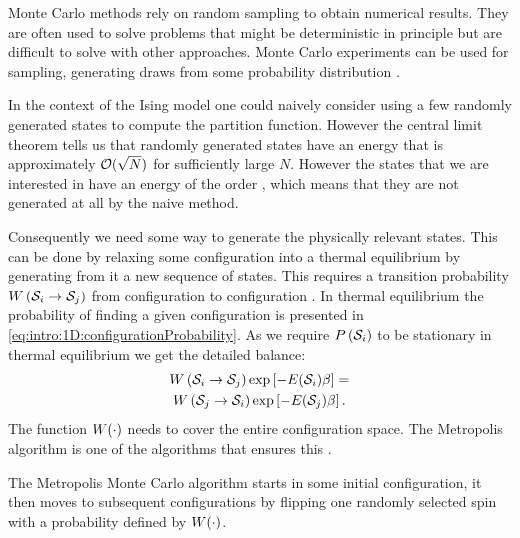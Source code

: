 
Monte Carlo methods rely on random sampling to obtain numerical results. They are often used to solve problems that might be deterministic in principle but are difficult to solve with other approaches. Monte Carlo experiments can be used for sampling, \ie generating draws from some probability distribution \cite{kroese2014monte}. 

In the context of the Ising model one could naively consider using a few randomly generated states to compute the partition function. However the central limit theorem tells us that randomly generated states have an energy that is approximately $\mathcal{O}(\sqrt{N})$ for sufficiently large $N$. However the states that we are interested in have an energy of the order , which means that they are not generated at all by the naive method. 

Consequently we need some way to generate the physically relevant states. This can be done by relaxing some configuration into a thermal equilibrium by generating from it a new sequence of states. This requires a transition probability $W\left(\mathcal{S}_{i} \to \mathcal{S}_{j} \right)$ from configuration  to configuration . In thermal equilibrium the probability of finding a given configuration is presented in \cref{eq:intro:1D:configurationProbability}. As we require $P\left(\mathcal{S}_{i}\right)$ to be stationary in thermal equilibrium we get the detailed balance:
\begin{multline}\label{eq:intro:mcm:detailedbalance}
	W\left(\mathcal{S}_{i} \to \mathcal{S}_{j}\right)\exp\left[-E(\mathcal{S}_{i})\beta \right] = \\
	W\left(\mathcal{S}_{j} \to \mathcal{S}_{i}\right)\exp\left[-E(\mathcal{S}_{j})\beta \right].
\end{multline}
The function $W(\cdot)$ needs to cover the entire configuration space. The Metropolis algorithm is one of the algorithms that ensures this \cite{kenzel1997physics}. 

The Metropolis Monte Carlo algorithm starts in some initial configuration, it then moves to subsequent configurations by flipping one randomly selected spin with a probability defined by \mbox{$W(\cdot)$}. 